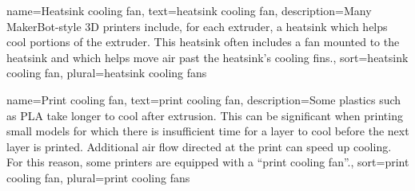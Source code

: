 {
        name={Heatsink cooling fan},
        text={heatsink cooling fan},
        description={Many MakerBot-style 3D printers include, for each extruder, a heatsink which helps cool portions of the extruder.  This heatsink often includes a fan mounted to the heatsink and which helps move air past the heatsink's cooling fins.},
        sort={heatsink cooling fan},
        plural=heatsink cooling fans
}

{
        name={Print cooling fan},
        text={print cooling fan},
        description={Some plastics such as PLA take longer to cool after extrusion.  This can be significant when printing small models for which there is insufficient time for a layer to cool before the next layer is printed.  Additional air flow directed at the print can speed up cooling.  For this reason, some printers are equipped with a ``print cooling fan''.},
        sort={print cooling fan},
        plural={print cooling fans}
}